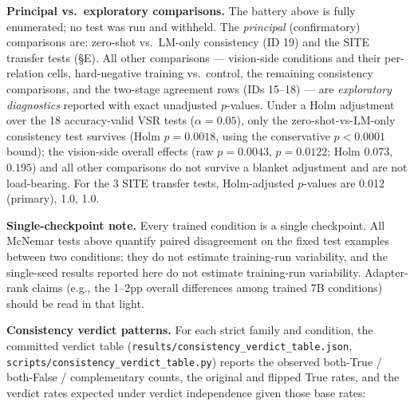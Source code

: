 \textbf{Principal vs.\ exploratory comparisons.} The battery above is fully
enumerated; no test was run and withheld. The \emph{principal}
(confirmatory) comparisons are: zero-shot vs.\ LM-only consistency (ID 19)
and the SITE transfer tests (\S E). All other comparisons --- vision-side
conditions and their per-relation cells, hard-negative training vs.\ control,
the remaining consistency comparisons, and the two-stage agreement rows
(IDs 15--18) --- are \emph{exploratory diagnostics} reported with exact
unadjusted $p$-values. Under a Holm adjustment over the 18 accuracy-valid
VSR tests ($\alpha{=}0.05$), only the zero-shot-vs-LM-only consistency test
survives (Holm $p{=}0.0018$, using the conservative $p{<}0.0001$ bound); the
vision-side overall effects (raw $p{=}0.0043$, $p{=}0.0122$; Holm $0.073$,
$0.195$) and all other comparisons do not survive a blanket adjustment and
are not load-bearing. For the 3 SITE transfer tests, Holm-adjusted $p$-values
are 0.012 (primary), 1.0, 1.0.

\textbf{Single-checkpoint note.} Every trained condition is a single
checkpoint. All McNemar tests above quantify paired disagreement on the fixed
test examples between two conditions; they do not estimate training-run
variability, and the single-seed results reported here do not estimate
training-run variability. Adapter-rank claims (e.g., the 1--2pp overall
differences among trained 7B conditions) should be read in that light.

\textbf{Consistency verdict patterns.} For each strict family and condition,
the committed verdict table
(\texttt{results/consistency\_verdict\_table.\allowbreak{}json},
\texttt{scripts/consistency\_verdict\_table.py}) reports the observed
both-True / both-False / complementary counts, the original and flipped True
rates, and the verdict rates expected under verdict independence given those
base rates:

